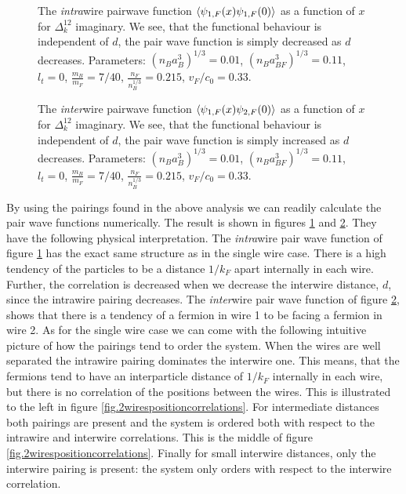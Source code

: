 \begin{figure} 
\begin{center}  
  
\caption{The \textit{intra}wire pairwave function $\braket{\psi_{1,F}(x)\psi_{1,F}(0)}$ as a function of $x$ for $\Delta^{12}_k$ imaginary. We see, that the functional behaviour is independent of $d$, the pair wave function is simply decreased as $d$ decreases. Parameters: $(n_Ba_B^3)^{1/3} = 0.01$, $(n_Ba_{BF}^3)^{1/3} = 0.11$, $l_t = 0$, $\frac{m_B}{m_F} = 7/40$, $\frac{n_F}{n_B^{1/3}} = 0.215$, $v_F/c_0 = 0.33$. }  
\label{fig.2wirespairwavefunction11}  
\end{center}    
\end{figure}

\begin{figure} 
\begin{center}  
  
\caption{The \textit{inter}wire pairwave function $\braket{\psi_{1,F}(x)\psi_{2,F}(0)}$ as a function of $x$ for $\Delta^{12}_k$ imaginary. We see, that the functional behaviour is independent of $d$, the pair wave function is simply increased as $d$ decreases. Parameters: $(n_Ba_B^3)^{1/3} = 0.01$, $(n_Ba_{BF}^3)^{1/3} = 0.11$, $l_t = 0$, $\frac{m_B}{m_F} = 7/40$, $\frac{n_F}{n_B^{1/3}} = 0.215$, $v_F/c_0 = 0.33$. }  
\label{fig.2wirespairwavefunction12}  
\end{center}    
\end{figure}

By using the pairings found in the above analysis we can readily calculate the pair wave functions numerically. The result is shown in figures \ref{fig.2wirespairwavefunction11} and \ref{fig.2wirespairwavefunction12}. They have the following physical interpretation. The \textit{intra}wire pair wave function of figure \ref{fig.2wirespairwavefunction11} has the exact same structure as in the single wire case. There is a high tendency of the particles to be a distance $1/k_F$ apart internally in each wire. Further, the correlation is decreased when we decrease the interwire distance, $d$, since the intrawire pairing decreases. The \textit{inter}wire pair wave function of figure \ref{fig.2wirespairwavefunction12}, shows that there is a tendency of a fermion in wire 1 to be facing a fermion in wire 2. As for the single wire case we can come with the following intuitive picture of how the pairings tend to order the system. When the wires are well separated the intrawire pairing dominates the interwire one. This means, that the fermions tend to have an interparticle distance of $1 / k_F$ internally in each wire, but there is no correlation of the positions between the wires. This is illustrated to the left in figure \ref{fig.2wirespositioncorrelations}. For intermediate distances both pairings are present and the system is ordered both with respect to the intrawire and interwire correlations. This is the middle of figure \ref{fig.2wirespositioncorrelations}. Finally for small interwire distances, only the interwire pairing is present: the system only orders with respect to the interwire correlation. 

